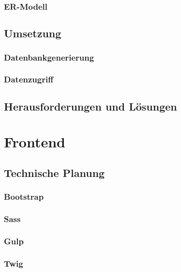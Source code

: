     \subsubsection{ER-Modell}

  \subsection{Umsetzung}

    \subsubsection{Datenbankgenerierung}

    \subsubsection{Datenzugriff}

  \subsection{Herausforderungen und Lösungen}

\section{Frontend}

  \subsection{Technische Planung}

    \subsubsection{Bootstrap}

    \subsubsection{Sass}

    \subsubsection{Gulp}

    \subsubsection{Twig}

